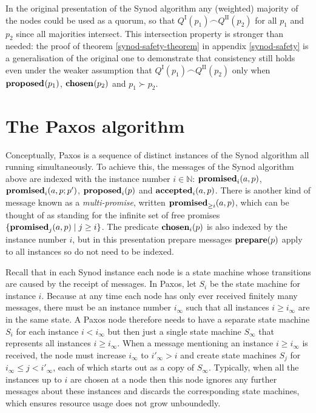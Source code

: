 \documentclass[journal]{IEEEtran}
\begin{document}
In the original presentation of the Synod algorithm any (weighted) majority of
the nodes could be used as a quorum, so that $Q^\textrm{I}(p_1) \frown
Q^\textrm{II}(p_2)$ for all $p_1$ and $p_2$ since all majorities intersect.
This intersection property is stronger than needed: the proof of theorem
\ref{synod-safety-theorem} in appendix \ref{synod-safety} is a generalisation
of the original one to demonstrate that consistency still holds even under the
weaker assumption that $Q^\textrm{I}(p_1) \frown Q^\textrm{II}(p_2)$ only when
$\mathbf{proposed}_{}(p_1)$, $\mathbf{chosen}_{}(p_2)$ and $p_1 \succ p_2$.

\section{The Paxos algorithm}

Conceptually, Paxos is a sequence of distinct instances of the Synod algorithm
all running simultaneously. To achieve this, the messages of the Synod
algorithm above are indexed with the instance number $i \in \mathbb N$:
$\mathbf{promised}_{i}(a,p)$, $\mathbf{promised}_{i}(a,p;p')$, $\mathbf{proposed}_{i}(p)$ and $\mathbf{accepted}_{i}(a,p)$.
There is another kind of message known as a \textit{multi-promise}, written
$\mathbf{promised}_{\ge i}(a,p)$, which can be thought of as standing for the infinite set of
free promises ${\{ \mathbf{promised}_{j}(a,p) \mid j \ge i \}}$. The predicate
$\mathbf{chosen}_{i}(p)$ is also indexed by the instance number $i$, but in this
presentation prepare messages $\mathbf{prepare}(p)$ apply to all instances so do not need
to be indexed.

Recall that in each Synod instance each node is a state machine whose
transitions are caused by the receipt of messages. In Paxos, let $S_i$ be the
state machine for instance $i$. Because at any time each node has only ever
received finitely many messages, there must be an instance number $i_\infty$
such that all instances $i \ge i_\infty$ are in the same state. A Paxos node
therefore needs to have a separate state machine $S_i$ for each instance $i <
i_\infty$ but then just a single state machine $S_\infty$ that represents all
instances $i \ge i_\infty$. When a message mentioning an instance $i \ge
i_\infty$ is received, the node must increase $i_\infty$ to $i'_\infty > i$ and
create state machines $S_j$ for $i_\infty \le j < i'_\infty$, each of which
starts out as a copy of $S_\infty$. Typically, when all the instances up to $i$
are chosen at a node then this node ignores any further messages about these
instances and discards the corresponding state machines, which ensures resource
usage does not grow unboundedly.
\end{document}
